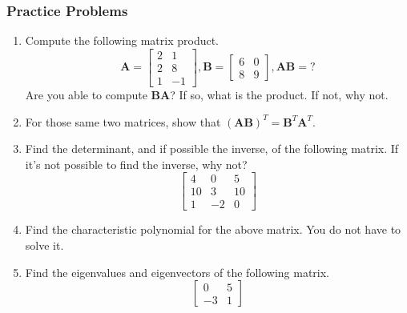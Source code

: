 \documentclass[10pt]{beamer}
\begin{document}
\begin{frame}
  \frametitle{Practice Problems}
  \begin{enumerate}
  \item Compute the following matrix product.
    $$\mathbf{A} = \left[\begin{matrix}
      2 & 1\\
      2 & 8\\
      1 & -1
    \end{matrix}\right], \mathbf{B} = \left[\begin{matrix}
      6 & 0\\
      8 & 9
    \end{matrix}\right], \mathbf{AB} = ?$$
    Are you able to compute $\mathbf{BA}$? If so, what is the product. If not, why not.
  \item For those same two matrices, show that $\left(\mathbf{AB}\right)^T = \mathbf{B}^T\mathbf{A}^T$.
  \item Find the determinant, and if possible the inverse, of the following matrix. If it's not possible to find the inverse, why not?
    $$\left[\begin{matrix}
      4 & 0 & 5\\
      10 & 3 & 10\\
      1 & -2 & 0
    \end{matrix}\right]$$
  \item Find the characteristic polynomial for the above matrix. You do not have to solve it.
  \item Find the eigenvalues and eigenvectors of the following matrix.
    $$\left[\begin{matrix}
      0 & 5\\
      -3 & 1
    \end{matrix}\right]$$
  \end{enumerate}
\end{frame}
\end{document}
